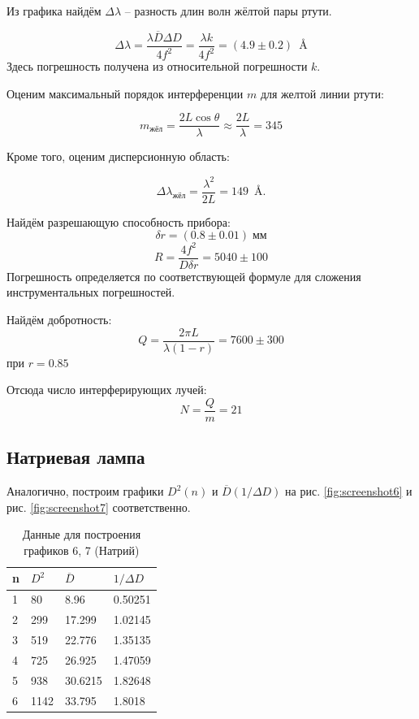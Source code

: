 \documentclass[a4paper]{article}
\begin{document}
Из графика найдём $ \Delta \lambda $ -- разность длин волн жёлтой пары ртути.

\begin{equation*}\label{key}
	\Delta \lambda = \frac{\lambda \overline{D} \Delta D}{4 f^2} = \frac{\lambda k}{4f^2} = (4.9 \pm 0.2) \; \SI{}{\angstrom}
\end{equation*}
Здесь погрешность получена из относительной погрешности $ k $.


Оценим максимальный порядок интерференции $m$ для желтой линии ртути:

\[
m_\text{жёл} = \frac{2L \cos \theta}{\lambda} \approx \frac{2L}{\lambda} = 345
\]

Кроме того, оценим дисперсионную область:

\[ \Delta \lambda_{жёл} = \frac{\lambda^2}{2 L}= 149 \; \SI{}{\angstrom}. \]

Найдём разрешающую способность прибора:
\begin{equation*}\label{key}
	 \delta r = (0.8 \pm 0.01) \;  мм 
\end{equation*}
\[ R = \frac{4f^2}{D \delta r} = 5040 \pm 100 \]
Погрешность определяется по соответствующей формуле для сложения инструментальных погрешностей.

Найдём добротность:
\[ Q = \frac{2 \pi L}{\lambda (1 - r)} = 7600 \pm 300\]
при $ r=0.85 $

Отсюда число интерферирующих лучей: 
\[N = \frac{Q}{m} = 21\]


\subsection{Натриевая лампа}

Аналогично, построим графики $ D^2(n) $ и $ \overline{D}(1/\Delta D) $ на рис. \ref{fig:screenshot6} и рис. \ref{fig:screenshot7} соответственно.

\begin{table}[h]
	\centering
	\begin{tabular}{|l|l|l|l|}
		\hline
		n & $D^2$ & $\overline{D}$ & $1/\Delta D$ \\ \hline
		1 & 80    & 8.96           & 0.50251      \\ \hline
		2 & 299   & 17.299         & 1.02145      \\ \hline
		3 & 519   & 22.776         & 1.35135      \\ \hline
		4 & 725   & 26.925         & 1.47059      \\ \hline
		5 & 938   & 30.6215        & 1.82648      \\ \hline
		6 & 1142  & 33.795         & 1.8018       \\ \hline
	\end{tabular}
	\caption{Данные для построения графиков 6, 7 (Натрий)}
	\label{tab:my-table}
\end{table}
\end{document}
